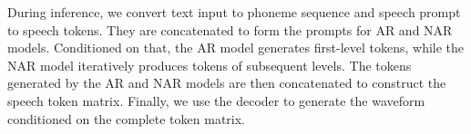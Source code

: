 During inference, we convert text input to phoneme sequence and speech prompt to speech tokens. They are concatenated to form the prompts for AR and NAR models. Conditioned on that, the AR model generates first-level tokens, while the NAR model iteratively produces tokens of subsequent levels. The tokens generated by the AR and NAR models are then concatenated to construct the speech token matrix. Finally, we use the \method decoder to generate the waveform conditioned on the complete token matrix. 
